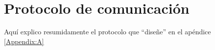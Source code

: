 \section{Protocolo de comunicación}
Aquí explico resumidamente el protocolo que ``diseñe'' en el apéndice \ref{Appendix:A}

